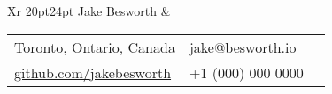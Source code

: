 \documentclass[9pt]{extarticle}
\makeatletter
\newcommand\HUGE{\@setfontsize\Huge{20pt}{24pt}}
\makeatother
\begin{document}
{
    \begin{tabularx}{\textwidth}{Xr}
    {\HUGE\leavevmode\color{em-light} Jake Besworth} &
        \null\hfill\small\begin{tabular}{llX}
            \faMapMarker\space\space\space\color{darkgrey} Toronto, Ontario, Canada & \faEnvelope\space\space\color{darkgrey} \href{mailto:jake@besworth.io}{jake@besworth.io} \\[3px]
            \faGithub\space\space\color{darkgrey} \href{https://github.com/jakebesworth}{github.com/jakebesworth} & {\large\faMobilePhone}\space\space\space\color{darkgrey} +1 (000) 000 0000 \\[10px]
        \end{tabular}
    \end{tabularx}

    {\color{lightgrey}{\centerline{\rule{17cm}{0.4pt}}}}
}
\end{document}
